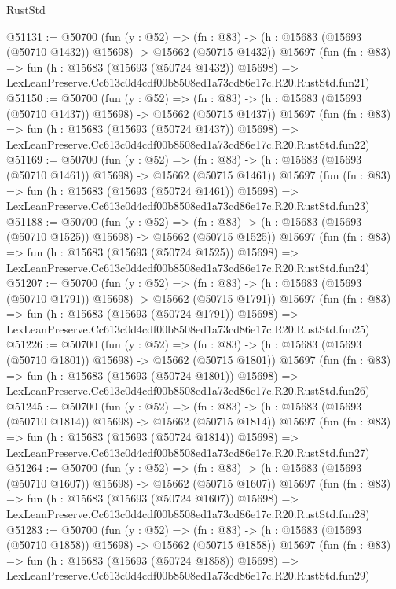 \begin{lexlean}{RustStd}
\begin{coremodule}
@51131 := @50700
    (fun (y : @52) =>
    (fn : @83) -> (h : @15683 (@15693 (@50710 @1432)) @15698) -> @15662 (@50715 @1432))
    @15697
    (fun (fn : @83) =>
    fun (h : @15683 (@15693 (@50724 @1432)) @15698) =>
    LexLeanPreserve.Cc613c0d4cdf00b8508ed1a73cd86e17c.R20.RustStd.fun21)
@51150 := @50700
    (fun (y : @52) =>
    (fn : @83) -> (h : @15683 (@15693 (@50710 @1437)) @15698) -> @15662 (@50715 @1437))
    @15697
    (fun (fn : @83) =>
    fun (h : @15683 (@15693 (@50724 @1437)) @15698) =>
    LexLeanPreserve.Cc613c0d4cdf00b8508ed1a73cd86e17c.R20.RustStd.fun22)
@51169 := @50700
    (fun (y : @52) =>
    (fn : @83) -> (h : @15683 (@15693 (@50710 @1461)) @15698) -> @15662 (@50715 @1461))
    @15697
    (fun (fn : @83) =>
    fun (h : @15683 (@15693 (@50724 @1461)) @15698) =>
    LexLeanPreserve.Cc613c0d4cdf00b8508ed1a73cd86e17c.R20.RustStd.fun23)
@51188 := @50700
    (fun (y : @52) =>
    (fn : @83) -> (h : @15683 (@15693 (@50710 @1525)) @15698) -> @15662 (@50715 @1525))
    @15697
    (fun (fn : @83) =>
    fun (h : @15683 (@15693 (@50724 @1525)) @15698) =>
    LexLeanPreserve.Cc613c0d4cdf00b8508ed1a73cd86e17c.R20.RustStd.fun24)
@51207 := @50700
    (fun (y : @52) =>
    (fn : @83) -> (h : @15683 (@15693 (@50710 @1791)) @15698) -> @15662 (@50715 @1791))
    @15697
    (fun (fn : @83) =>
    fun (h : @15683 (@15693 (@50724 @1791)) @15698) =>
    LexLeanPreserve.Cc613c0d4cdf00b8508ed1a73cd86e17c.R20.RustStd.fun25)
@51226 := @50700
    (fun (y : @52) =>
    (fn : @83) -> (h : @15683 (@15693 (@50710 @1801)) @15698) -> @15662 (@50715 @1801))
    @15697
    (fun (fn : @83) =>
    fun (h : @15683 (@15693 (@50724 @1801)) @15698) =>
    LexLeanPreserve.Cc613c0d4cdf00b8508ed1a73cd86e17c.R20.RustStd.fun26)
@51245 := @50700
    (fun (y : @52) =>
    (fn : @83) -> (h : @15683 (@15693 (@50710 @1814)) @15698) -> @15662 (@50715 @1814))
    @15697
    (fun (fn : @83) =>
    fun (h : @15683 (@15693 (@50724 @1814)) @15698) =>
    LexLeanPreserve.Cc613c0d4cdf00b8508ed1a73cd86e17c.R20.RustStd.fun27)
@51264 := @50700
    (fun (y : @52) =>
    (fn : @83) -> (h : @15683 (@15693 (@50710 @1607)) @15698) -> @15662 (@50715 @1607))
    @15697
    (fun (fn : @83) =>
    fun (h : @15683 (@15693 (@50724 @1607)) @15698) =>
    LexLeanPreserve.Cc613c0d4cdf00b8508ed1a73cd86e17c.R20.RustStd.fun28)
@51283 := @50700
    (fun (y : @52) =>
    (fn : @83) -> (h : @15683 (@15693 (@50710 @1858)) @15698) -> @15662 (@50715 @1858))
    @15697
    (fun (fn : @83) =>
    fun (h : @15683 (@15693 (@50724 @1858)) @15698) =>
    LexLeanPreserve.Cc613c0d4cdf00b8508ed1a73cd86e17c.R20.RustStd.fun29)

\end{coremodule}
\end{lexlean}
